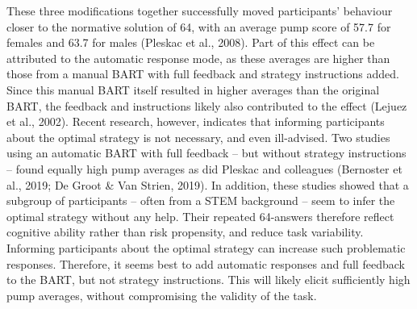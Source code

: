 \documentclass[serif, twocolumn, review]{jote-article}
\begin{document}
These three modifications together successfully moved participants' behaviour closer to the normative solution of 64, with an average pump score of 57.7 for females and 63.7 for males (Pleskac et al., 2008). Part of this effect can be attributed to the automatic response mode, as these averages are higher than those from a manual BART with full feedback and strategy instructions added. Since this manual BART itself resulted in higher averages than the original BART, the feedback and instructions likely also contributed to the effect (Lejuez et al., 2002). Recent research, however, indicates that informing participants about the optimal strategy is not necessary, and even ill-advised. Two studies using an automatic BART with full feedback -- but without strategy instructions -- found equally high pump averages as did Pleskac and colleagues (Bernoster et al., 2019; De Groot \& Van Strien, 2019). In addition, these studies showed that a subgroup of participants -- often from a STEM background -- seem to infer the optimal strategy without any help. Their repeated 64-answers therefore reflect cognitive ability rather than risk propensity, and reduce task variability. Informing participants about the optimal strategy can increase such problematic responses. Therefore, it seems best to add automatic responses and full feedback to the BART, but not strategy instructions. This will likely elicit sufficiently high pump averages, without compromising the validity of the task.
\end{document}
